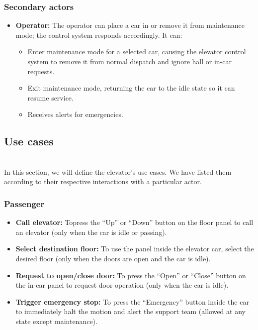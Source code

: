 \subsubsection{Secondary actors}\label{TBnTqUakok6PN7f1Ye6YW}

\begin{itemize}
\item
\protect{}\label{XV-Y6AVIla1vSLeXzU_YJ}
\textbf{Operator:} The operator can place a car in or remove it from maintenance mode; the control system responds accordingly. It can:

\begin{itemize}
\item
Enter maintenance mode for a selected car, causing the elevator control system to remove it from normal dispatch and ignore hall or in-car requests.
\item
Exit maintenance mode, returning the car to the idle state so it can resume service.
\item
Receives alerts for emergencies.
\end{itemize}
\end{itemize}

\subsection{Use cases}\label{ctcX6wru-P3TUT1a4vYN8}
\\
In this section, we will define the elevator's use cases. We have listed them according to their respective interactions with a particular actor.

\subsubsection{Passenger}\label{F7w9XgNGU3jR71QHGC6JC}

\begin{itemize}
\item
\protect{}\label{UNGjZGIquZyfbEwdDQZJf}
\textbf{Call elevator:} Topress the ``Up'' or ``Down'' button on the floor panel to call an elevator (only when the car is idle or passing).
\item
\protect{}\label{-RBvVK-IUd8sii9zYnlgU}
\textbf{Select destination floor:} To use the panel inside the elevator car, select the desired floor (only when the doors are open and the car is idle).
\item
\protect{}\label{5pWq1yjcfO619E7usuFH7}
\textbf{Request to open/close door:} To press the ``Open'' or ``Close'' button on the in-car panel to request door operation (only when the car is idle).
\item
\protect{}\label{sBbDnV2Y4eByXyPQhdpWx}
\textbf{Trigger emergency stop:} To press the ``Emergency'' button inside the car to immediately halt the motion and alert the support team (allowed at any state except maintenance).
\end{itemize}

